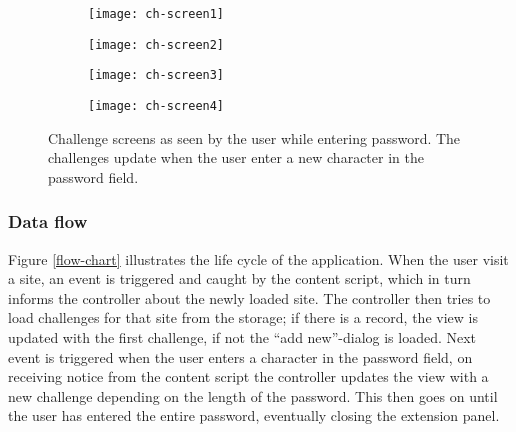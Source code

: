 \begin{figure}
    \centering
    \begin{subfigure}[t]{0.45\textwidth}
        \centering
        \texttt{[image: ch-screen1]} 
        \caption{}
        \label{challenge-screen1}
    \end{subfigure}
    \hfill
    \begin{subfigure}[t]{0.45\textwidth}
        \centering
        \texttt{[image: ch-screen2]} 
        \caption{}
        \label{challenge-screen2}
    \end{subfigure}
    \hfill
    \begin{subfigure}[t]{0.45\textwidth}
        \centering
        \texttt{[image: ch-screen3]} 
        \caption{}
        \label{challenge-screen3}
    \end{subfigure}
    \hfill
    \begin{subfigure}[t]{0.45\textwidth}
        \centering
        \texttt{[image: ch-screen4]} 
        \caption{}
        \label{challenge-screen4}
    \end{subfigure}
    \caption{Challenge screens as seen by the user while entering password. The challenges update when the user enter a new character in the password field.}
    \label{ch-screens}
\end{figure}



\subsubsection{Data flow}\label{data-flow}
Figure \ref{flow-chart} illustrates the life cycle of the application. When the user visit a site, an event is triggered and caught by the content script, which in turn informs the controller about the newly loaded site. The controller then tries to load challenges for that site from the storage; if there is a record, the view is updated with the first challenge, if not the ``add new''-dialog is loaded. Next event is triggered when the user enters a character in the password field, on receiving notice from the content script the controller updates the view with a new challenge depending on the length of the password. This then goes on until the user has entered the entire password, eventually closing the extension panel.



